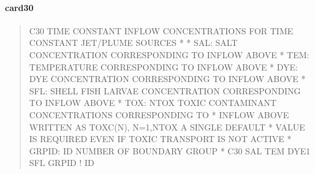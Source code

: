 \documentclass[letterpaper,10pt,english]{sphinxmanual}
\begin{document}
\paragraph{card30}
\label{\detokenize{inputfiles/runcontrol/card30:card30}}\label{\detokenize{inputfiles/runcontrol/card30::doc}}\begin{quote}

\begin{sphinxVerbatim}[commandchars=\\\{\}]
\PYGZhy{}\PYGZhy{}\PYGZhy{}\PYGZhy{}\PYGZhy{}\PYGZhy{}\PYGZhy{}\PYGZhy{}\PYGZhy{}\PYGZhy{}\PYGZhy{}\PYGZhy{}\PYGZhy{}\PYGZhy{}\PYGZhy{}\PYGZhy{}\PYGZhy{}\PYGZhy{}\PYGZhy{}\PYGZhy{}\PYGZhy{}\PYGZhy{}\PYGZhy{}\PYGZhy{}\PYGZhy{}\PYGZhy{}\PYGZhy{}\PYGZhy{}\PYGZhy{}\PYGZhy{}\PYGZhy{}\PYGZhy{}\PYGZhy{}\PYGZhy{}\PYGZhy{}\PYGZhy{}\PYGZhy{}\PYGZhy{}\PYGZhy{}\PYGZhy{}\PYGZhy{}\PYGZhy{}\PYGZhy{}\PYGZhy{}\PYGZhy{}\PYGZhy{}\PYGZhy{}\PYGZhy{}\PYGZhy{}\PYGZhy{}\PYGZhy{}\PYGZhy{}\PYGZhy{}\PYGZhy{}\PYGZhy{}\PYGZhy{}\PYGZhy{}\PYGZhy{}\PYGZhy{}\PYGZhy{}\PYGZhy{}\PYGZhy{}\PYGZhy{}\PYGZhy{}\PYGZhy{}\PYGZhy{}\PYGZhy{}\PYGZhy{}\PYGZhy{}\PYGZhy{}\PYGZhy{}\PYGZhy{}\PYGZhy{}\PYGZhy{}\PYGZhy{}\PYGZhy{}\PYGZhy{}\PYGZhy{}
C30 TIME CONSTANT INFLOW CONCENTRATIONS FOR TIME CONSTANT JET/PLUME SOURCES
*
*    SAL: SALT CONCENTRATION CORRESPONDING TO INFLOW ABOVE
*    TEM: TEMPERATURE CORRESPONDING TO INFLOW ABOVE
*    DYE: DYE CONCENTRATION CORRESPONDING TO INFLOW ABOVE
*    SFL: SHELL FISH LARVAE CONCENTRATION CORRESPONDING TO INFLOW ABOVE
*    TOX: NTOX TOXIC CONTAMINANT CONCENTRATIONS CORRESPONDING TO
*         INFLOW ABOVE  WRITTEN AS TOXC(N), N=1,NTOX A SINGLE DEFAULT
*         VALUE IS REQUIRED EVEN IF TOXIC TRANSPORT IS NOT ACTIVE
*  GRPID: ID NUMBER OF BOUNDARY GROUP
*
C30       SAL       TEM      DYE1       SFL      GRPID ! ID
\end{sphinxVerbatim}
\end{quote}
\end{document}
